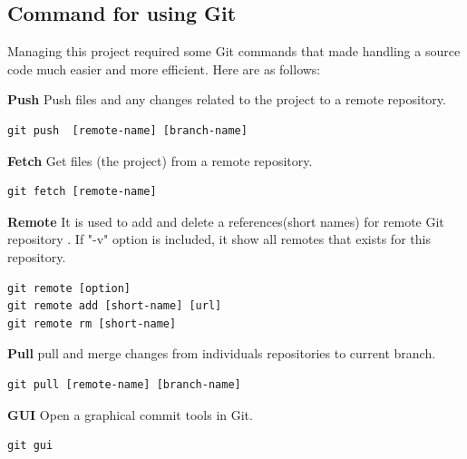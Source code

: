 \documentclass[11pt]{report}
\begin{document}
\subsection{Command for using Git}
\label{subsec: Command for using Git}
Managing this project required some Git commands that made handling a source code much easier and more efficient. Here are as follows:

\textbf{Push} Push files and any changes related to the project  to a remote repository.
\begin{verbatim}
git push  [remote-name] [branch-name]
\end{verbatim}

\textbf{Fetch} Get files (the project) from a remote repository.
\begin{verbatim}
git fetch [remote-name]
\end{verbatim}

\textbf{Remote} It is used to add and delete a  references(short names) for remote Git repository . If "-v" option is included, it show all remotes that exists for this repository.
\begin{verbatim}
git remote [option]
git remote add [short-name] [url]
git remote rm [short-name]
\end{verbatim}

\textbf{Pull} pull and merge changes from individuals repositories to current branch.
\begin{verbatim}
git pull [remote-name] [branch-name]
\end{verbatim}

\textbf{GUI} Open a graphical commit tools in Git.
\begin{verbatim}
git gui
\end{verbatim}
\end{document}
